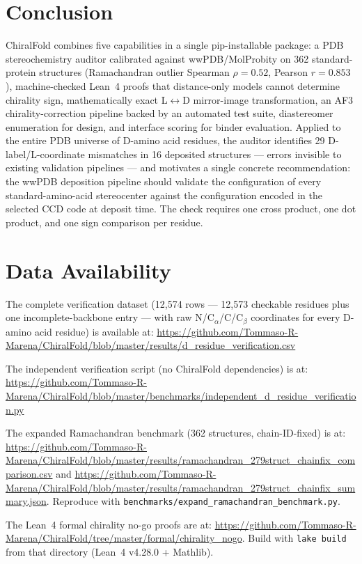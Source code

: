 \documentclass[11pt]{article}
\begin{document}
\section{Conclusion}

ChiralFold combines five capabilities in a single pip-installable package: a PDB stereochemistry auditor calibrated against wwPDB/MolProbity on 362 standard-protein structures (Ramachandran outlier Spearman $\rho=0.52$, Pearson $r=0.853$), machine-checked Lean~4 proofs that distance-only models cannot determine chirality sign, mathematically exact L$\leftrightarrow$D mirror-image transformation, an AF3 chirality-correction pipeline backed by an automated test suite, diastereomer enumeration for design, and interface scoring for binder evaluation. Applied to the entire PDB universe of D-amino acid residues, the auditor identifies 29 D-label/L-coordinate mismatches in 16 deposited structures --- errors invisible to existing validation pipelines --- and motivates a single concrete recommendation: the wwPDB deposition pipeline should validate the configuration of every standard-amino-acid stereocenter against the configuration encoded in the selected CCD code at deposit time. The check requires one cross product, one dot product, and one sign comparison per residue.

\section{Data Availability}

The complete verification dataset (12,574 rows --- 12,573 checkable residues plus one incomplete-backbone entry --- with raw N/C$_\alpha$/C/C$_\beta$ coordinates for every D-amino acid residue) is available at: \url{https://github.com/Tommaso-R-Marena/ChiralFold/blob/master/results/d_residue_verification.csv}

The independent verification script (no ChiralFold dependencies) is at: \url{https://github.com/Tommaso-R-Marena/ChiralFold/blob/master/benchmarks/independent_d_residue_verification.py}

The expanded Ramachandran benchmark (362 structures, chain-ID-fixed) is at: \url{https://github.com/Tommaso-R-Marena/ChiralFold/blob/master/results/ramachandran_279struct_chainfix_comparison.csv} and \url{https://github.com/Tommaso-R-Marena/ChiralFold/blob/master/results/ramachandran_279struct_chainfix_summary.json}. Reproduce with \texttt{benchmarks/expand\_ramachandran\_benchmark.py}.

The Lean~4 formal chirality no-go proofs are at: \url{https://github.com/Tommaso-R-Marena/ChiralFold/tree/master/formal/chirality_nogo}. Build with \texttt{lake build} from that directory (Lean~4 v4.28.0 + Mathlib).
\end{document}
